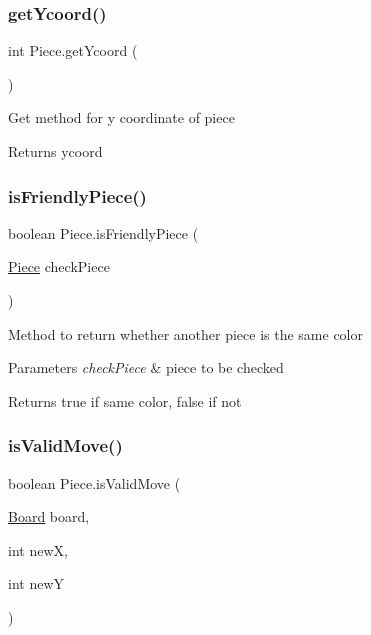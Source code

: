 \subsubsection{\texorpdfstring{getYcoord()}{getYcoord()}}
{\footnotesize\ttfamily int Piece.\+get\+Ycoord (\begin{DoxyParamCaption}{ }\end{DoxyParamCaption})\hspace{0.3cm}{\ttfamily [inline]}}

Get method for y coordinate of piece \begin{DoxyReturn}{Returns}
ycoord 
\end{DoxyReturn}
\mbox{\label{class_piece_a453be38e2005fee525f297fe3cfec0f0}} 
\subsubsection{\texorpdfstring{isFriendlyPiece()}{isFriendlyPiece()}}
{\footnotesize\ttfamily boolean Piece.\+is\+Friendly\+Piece (\begin{DoxyParamCaption}\item[{\mbox{\hyperlink{class_piece}{Piece}}}]{check\+Piece }\end{DoxyParamCaption})\hspace{0.3cm}{\ttfamily [inline]}}

Method to return whether another piece is the same color 
\begin{DoxyParams}{Parameters}
{\em check\+Piece} & piece to be checked \\
\hline
\end{DoxyParams}
\begin{DoxyReturn}{Returns}
true if same color, false if not 
\end{DoxyReturn}
\mbox{\label{class_piece_ac4cf6701c965e80a20ade44cfa0003a4}} 
\subsubsection{\texorpdfstring{isValidMove()}{isValidMove()}}
{\footnotesize\ttfamily boolean Piece.\+is\+Valid\+Move (\begin{DoxyParamCaption}\item[{\mbox{\hyperlink{class_board}{Board}}}]{board,  }\item[{int}]{newX,  }\item[{int}]{newY }\end{DoxyParamCaption})\hspace{0.3cm}{\ttfamily [inline]}}

